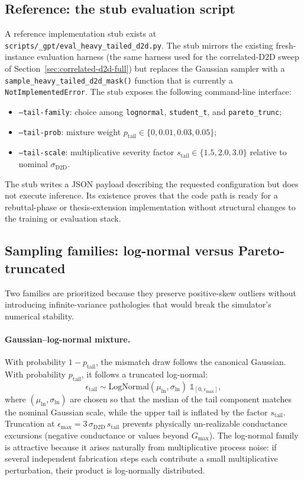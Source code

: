 \subsection{Reference: the stub evaluation script}

A reference implementation stub exists at \texttt{scripts/\_gpt/eval\_heavy\_tailed\_d2d.py}.  The stub mirrors the existing fresh-instance evaluation harness (the same harness used for the correlated-D2D sweep of Section~\ref{sec:correlated-d2d-full}) but replaces the Gaussian sampler with a \texttt{sample\_heavy\_tailed\_d2d\_mask()} function that is currently a \texttt{NotImplementedError}.  The stub exposes the following command-line interface:
\begin{itemize}[leftmargin=1.4em]
    \item \texttt{--tail-family}: choice among \texttt{lognormal}, \texttt{student\_t}, and \texttt{pareto\_trunc};
    \item \texttt{--tail-prob}: mixture weight $p_{\text{tail}} \in \{0, 0.01, 0.03, 0.05\}$;
    \item \texttt{--tail-scale}: multiplicative severity factor $s_{\text{tail}} \in \{1.5, 2.0, 3.0\}$ relative to nominal $\sigma_{\text{D2D}}$.
\end{itemize}
The stub writes a JSON payload describing the requested configuration but does not execute inference.  Its existence proves that the code path is ready for a rebuttal-phase or thesis-extension implementation without structural changes to the training or evaluation stack.

\subsection{Sampling families: log-normal versus Pareto-truncated}

Two families are prioritized because they preserve positive-skew outliers without introducing infinite-variance pathologies that would break the simulator's numerical stability.

\paragraph{Gaussian--log-normal mixture.}  With probability $1-p_{\text{tail}}$, the mismatch draw follows the canonical Gaussian.  With probability $p_{\text{tail}}$, it follows a truncated log-normal:
\begin{equation}
    \epsilon_{\text{tail}} \sim \text{LogNormal}(\mu_{\ln}, \sigma_{\ln})\; \mathbb{1}_{[0, \epsilon_{\max}]},
    \label{eq:lognormal-mixture}
\end{equation}
where $(\mu_{\ln}, \sigma_{\ln})$ are chosen so that the median of the tail component matches the nominal Gaussian scale, while the upper tail is inflated by the factor $s_{\text{tail}}$.  Truncation at $\epsilon_{\max} = 3\,\sigma_{\text{D2D}}\,s_{\text{tail}}$ prevents physically un-realizable conductance excursions (negative conductance or values beyond $G_{\max}$).  The log-normal family is attractive because it arises naturally from multiplicative process noise: if several independent fabrication steps each contribute a small multiplicative perturbation, their product is log-normally distributed.


